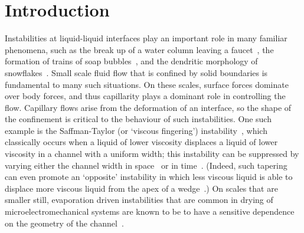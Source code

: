 \documentclass{jfm}
\begin{document}
\section{Introduction}\label{S:Introduction}
Instabilities at liquid-liquid interfaces play an important role in many familiar phenomena, such as the break up of a water column leaving a faucet~\citep{Plateau1873, Rayleigh1879PRSL}, the formation of trains of soap bubbles~\citep{Eggers2008RepProgPhys}, and the dendritic morphology of snowflakes~\citep{Langer1980RevModPhys}. %
Small scale fluid flow that is confined by solid boundaries is fundamental to many such situations.  On these scales, surface forces dominate over body forces, and thus capillarity plays a dominant role in controlling the flow. Capillary flows arise from the deformation of an interface, so the shape of the confinement is critical to the behaviour of such instabilities. One such example is the Saffman-Taylor (or `viscous fingering') instability~\citep{Saffman1958PRSL}, which classically occurs when a liquid of lower viscosity displaces a liquid of lower viscosity in a channel with a uniform width; this instability can be suppressed by varying either the channel width in space~\citep{AlHousseiny2012NaturePhysics, AlHousseiny2013PhysFlu, Reyssat2014JFM} or in time~\citep{Zheng2015PRL}. (Indeed, such tapering can even promote an `opposite' instability in which less viscous liquid is able to displace more viscous liquid from the apex of a wedge~\citep{Keiser2016JFM}.) On scales that are smaller still, evaporation driven instabilities that are common in drying of microelectromechanical systems are known to be to have a sensitive dependence on the geometry of the channel~\citep{LedesmaAguilar2017SoftMatter, Hadjittofis2016JFM}.
\end{document}
